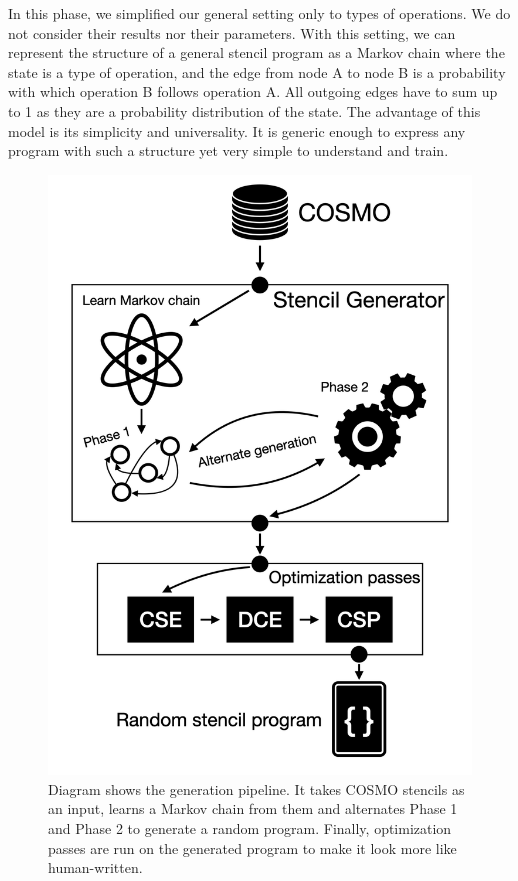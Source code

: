 \documentclass[sigplan,\review anonymous]{acmart}
\begin{document}
In this phase, we simplified our general setting only to types of operations.
We do not consider their results nor their parameters. With this setting, we
can represent the structure of a general stencil program as a Markov chain
where the state is a type of operation, and the edge from node A to node B
is a probability with which operation B follows operation A. All outgoing
edges have to sum up to 1 as they are a probability distribution of the
state. The advantage of this model is its simplicity and universality. It
is generic enough to express any program with such a structure yet very
simple to understand and train. 

\begin{figure}
  \centering
  \includegraphics[width=\columnwidth]{images/rspg_diagram.png}
  \caption{ Diagram shows the generation pipeline. It takes COSMO stencils as
  an input, learns a Markov chain from them and alternates Phase 1 and Phase 2
  to generate a random program. Finally, optimization passes are run on the 
  generated program to make it look more like human-written. }
  \label{fig:rspg_diagram}
\end{figure}
\end{document}
